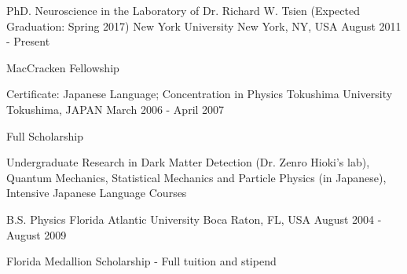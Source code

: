 


\begin{cventries}



\cventry
{PhD. Neuroscience in the Laboratory of Dr. Richard W. Tsien (Expected Graduation: Spring 2017) } %
{New York University} %
{New York, NY, USA} %
{August 2011 - Present} %
{ %
\begin{cvitems}
\item {MacCracken Fellowship}
\end{cvitems}
}
\cventry
{Certificate: Japanese Language; Concentration in Physics} %
{Tokushima University} %
{Tokushima, JAPAN} %
{March 2006 - April 2007} %
{ %
\begin{cvitems}
\item {Full Scholarship}
\item {Undergraduate Research in Dark Matter Detection (Dr. Zenro Hioki's lab), Quantum Mechanics, Statistical Mechanics and Particle Physics (in Japanese), Intensive Japanese Language Courses}
\end{cvitems}
}
\cventry
{B.S. Physics} %
{Florida Atlantic University} %
{Boca Raton, FL, USA} %
{August 2004 - August 2009} %
{ %
\begin{cvitems}
\item {Florida Medallion Scholarship - Full tuition and stipend}
\end{cvitems}
}


\end{cventries}
